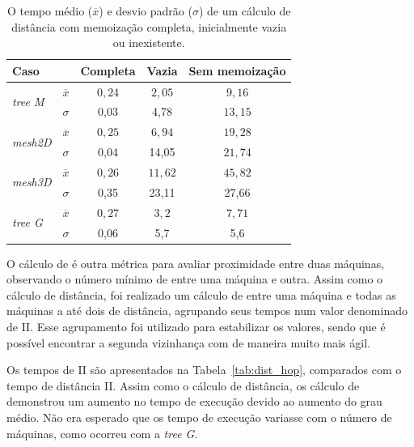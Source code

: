 \setlength{\tabcolsep}{0.5em}
\begin{table}[!ht]
    \centering
    \begin{tabular}{l c c c c}
        \toprule
        \textbf{Caso} & &   \textbf{Completa} & \textbf{Vazia} & \textbf{Sem memoização}\\ \midrule
        \multirow{2}{*}{\textit{tree M}}  & $\overline{x}$   & $0,24$      & $2,05$    & $9,16$  \\ 
        & $\sigma$ & 0,03 & 4,78 & $13,15$ \\ \hline
        \multirow{2}{*}{\textit{mesh2D}}  & $\overline{x}$  & $0,25$       & $6,94$    & $19,28$   \\ 
        & $\sigma$ & 0,04 & 14,05 & $21,74$\\ \hline
        \multirow{2}{*}{\textit{mesh3D}}  & $\overline{x}$   & $0,26$     & $11,62$   & $45,82$    \\ 
        & $\sigma$ & 0,35  & 23,11 & 27,66 \\ \hline
        \multirow{2}{*}{\textit{tree G}}  & $\overline{x}$   & $0,27$      & $3,2$    & $7,71$   \\
        & $\sigma$ & 0,06 & 5,7 & 5,6 \\
        \bottomrule
    \end{tabular}
    \caption[Tempo médio de um cálculo de distância.]{O tempo médio ($\overline{x}$) e desvio padrão ($\sigma$) de um cálculo de distância com memoização completa, inicialmente vazia ou inexistente.}
    \label{tab:avg_dist_comparison}
\end{table}


O cálculo de \hops é outra métrica para avaliar proximidade entre duas máquinas, observando o número mínimo de \links entre uma máquina e outra.
Assim como o cálculo de distância, foi realizado um cálculo de \hops entre uma máquina e todas as máquinas a até dois \hops de distância, agrupando seus tempos num valor denominado de \hops II.
Esse agrupamento foi utilizado para estabilizar os valores, sendo que é possível encontrar a segunda vizinhança com \hops de maneira muito mais ágil.

Os tempos de \hops II são apresentados na Tabela~\ref{tab:dist_hop}, comparados com o tempo de distância II.
Assim como o cálculo de distância, os cálculo de \hops demonstrou um aumento no tempo de execução devido ao aumento do grau médio.
Não era esperado que os tempo de execução variasse com o número de máquinas, como ocorreu com a \textit{tree G}.

